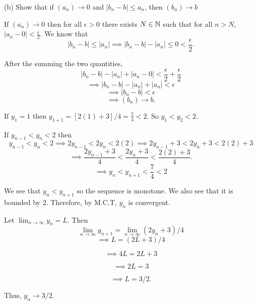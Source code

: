 \documentclass{report}
\begin{document}
\bigskip
(b) Show that if $\left(a_n\right) \rightarrow 0$ and $\left|b_n-b\right| \leq a_n$, then $\left(b_n\right) \rightarrow b$

\begin{myproof}
    
  If $(a_n) \rightarrow 0 $ then for all $\epsilon > 0 $ there exists
$N \in \NN$ such that for all $n > N$, $|a_n - 0| < \frac{\epsilon}{2}.$ We know that $$|b_n - b| \leq |a_n|  \implies |b_n - b| - |a_n|\leq 0 < \frac{\epsilon}{2}.$$

After the summing the two quantities,
 $$|b_n - b| - |a_n| + |a_n -0| < \frac{\epsilon}{2} + \frac{\epsilon}{2}$$ $$\implies |b_n - b| - |a_n| + |a_n| < \epsilon$$
$$ \implies |b_n - b|  < \epsilon $$ $$\implies (b_n) \rightarrow b.$$

\end{myproof}


\begin{myproof}

  If $y_1 = 1$ then $y_{1+1} =  [2(1) +3]/4 = \frac{5}{4} < 2.$ So $y_1 < y_2 < 2.$
    
  If $y_{n-1}<y_n<2$ then $$y_{n-1}<y_{n}<2 \implies 2y_{n-1}<2y_{n}<2(2)\implies 2y_{n-1} + 3<2y_{n} +3 <2(2) +3  $$
 $$ \implies \frac{2y_{n-1} + 3}{4}<\frac{2y_{n} +3}{4} <\frac{2(2) +3}{4}. $$
 $$ \implies y_{n} <y_{n+1} <\frac{7}{4} < 2$$

We see that $y_n < y_{n+1}$ so the sequence is monotone. We also see that it is bounded by $2.$  Therefore, by M.C.T, $y_n$ is convergent.
\par
Let $\lim_{n \rightarrow \infty} y_{n} = L$. Then $$\lim_{n \rightarrow \infty} y_{n+1} = \lim_{n \rightarrow \infty}\left(2 y_n+3\right) / 4$$ 
$$\implies L = \left(2 L+3\right) / 4$$ 

$$\implies 4L = 2 L+3$$ 

$$\implies 2L = 3$$ 

$$\implies L = 3/2.$$ 

Thus, ${y_n} \rightarrow 3/2.$
\end{myproof}
\pagebreak
\end{document}
